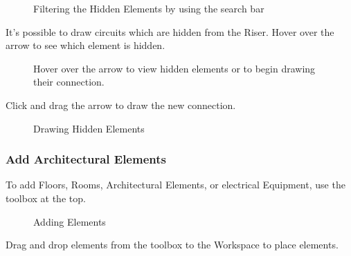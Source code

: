 \documentclass[letterpaper,10pt,english]{sphinxmanual}
\begin{document}
\begin{figure}[H]
\centering
\capstart

\noindent{}
\caption{Filtering the Hidden Elements by using the search bar}\label{\detokenize{docs/userguide/buildingelectricalmodel/riser/index-riser:id13}}\end{figure}

It’s possible to draw circuits which are hidden from the Riser.  Hover over the arrow to see which element is hidden.

\begin{figure}[H]
\centering
\capstart

\noindent{}
\caption{Hover over the arrow to view hidden elements or to begin drawing their connection.}\label{\detokenize{docs/userguide/buildingelectricalmodel/riser/index-riser:id14}}\end{figure}

Click and drag the arrow to draw the new connection.

\begin{figure}[H]
\centering
\capstart

\noindent{}
\caption{Drawing Hidden Elements}\label{\detokenize{docs/userguide/buildingelectricalmodel/riser/index-riser:id15}}\end{figure}


\subsubsection{Add Architectural Elements}
\label{\detokenize{docs/userguide/buildingelectricalmodel/riser/index-riser:add-architectural-elements}}\label{\detokenize{docs/userguide/buildingelectricalmodel/riser/index-riser:riser-toolbox-arch-elements}}
To add Floors, Rooms, Architectural Elements, or electrical Equipment, use the toolbox at the top.

\begin{figure}[H]
\centering
\capstart

\noindent{}
\caption{Adding Elements}\label{\detokenize{docs/userguide/buildingelectricalmodel/riser/index-riser:id16}}\end{figure}

Drag and drop elements from the toolbox to the Workspace to place elements.
\end{document}
